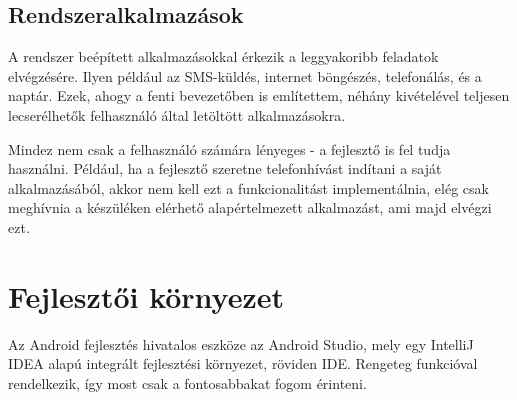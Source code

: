 \subsection{Rendszeralkalmazások}
A rendszer beépített alkalmazásokkal érkezik a leggyakoribb feladatok elvégzésére. Ilyen például az SMS-küldés, internet böngészés, telefonálás, és a naptár. Ezek, ahogy a fenti bevezetőben is említettem, néhány kivételével teljesen lecserélhetők felhasználó által letöltött alkalmazásokra.

Mindez nem csak a felhasználó számára lényeges - a fejlesztő is fel tudja használni. Például, ha a fejlesztő szeretne telefonhívást indítani a saját alkalmazásából, akkor nem kell ezt a funkcionalitást implementálnia, elég csak meghívnia a készüléken elérhető alapértelmezett alkalmazást, ami majd elvégzi ezt. \cite{PlatformGuide}

\section{Fejlesztői környezet}

Az Android fejlesztés hivatalos eszköze az Android Studio, mely egy IntelliJ IDEA alapú integrált fejlesztési környezet, röviden IDE.\cite{AndroidStudio} Rengeteg funkcióval rendelkezik, így most csak a fontosabbakat fogom érinteni.

